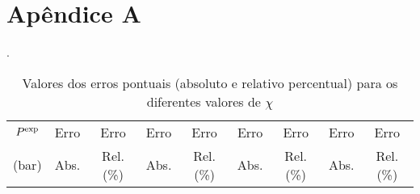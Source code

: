 \section*{Apêndice A}\label{apA}

\begin{table}[H]
\centering
\renewcommand{\arraystretch}{1.1}
\footnotesize
\caption*{Valores dos erros pontuais (absoluto e relativo
 percentual) para os diferentes valores de $\chi$}.
\label{ApAT4}
\begin{tabular}{SSS[table-format=2.2,round-mode=places,round-precision=2]SS[table-format=2.2,round-mode=places,round-precision=2]SS[table-format=2.2,round-mode=places,round-precision=2]SS[table-format=2.2,round-mode=places,round-precision=2]}  
\toprule
{$P^{\rm{exp}}$}&{Erro}&{Erro}&{Erro}&{Erro}&{Erro}&{Erro}&{Erro}&{Erro}\\
{(bar)}&{Abs.}&{Rel. (\%)}&{Abs.}&{Rel. (\%)}&{Abs.}&{Rel. (\%)}&{Abs.}&{Rel.
(\%)}\\
\midrule


\end{tabular}
\end{table}
